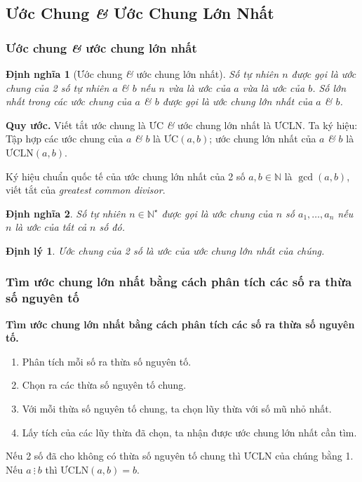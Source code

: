 \documentclass{article}
\numberwithin{equation}{section}
\newtheorem{definition}{Định nghĩa}[section]
\newtheorem{theorem}{Định lý}[section]
\begin{document}
\subsection{Ước Chung \textit{\&} Ước Chung Lớn Nhất}

\subsubsection{Ước chung \textit{\&} ước chung lớn nhất}

\begin{definition}[Ước chung \textit{\&} ước chung lớn nhất]
	Số tự nhiên $n$ được gọi là \emph{ước chung} của 2 số tự nhiên $a$ \textit{\&} $b$ nếu $n$ vừa là ước của $a$ vừa là ước của $b$. Số lớn nhất trong các ước chung của $a$ \textit{\&} $b$ được gọi là \emph{ước chung lớn nhất} của $a$ \textit{\&} $b$.
\end{definition}
\noindent\textbf{Quy ước.} Viết tắt ước chung là ƯC \textit{\&} ước chung lớn nhất là ƯCLN. Ta ký hiệu: Tập hợp các ước chung của $a$ \textit{\&} $b$ là $\mbox{ƯC}(a,b)$; ước chung lớn nhất của $a$ \textit{\&} $b$ là $\mbox{ƯCLN}(a,b)$.

Ký hiệu chuẩn quốc tế của ước chung lớn nhất của 2 số $a,b\in\mathbb{N}$ là $\gcd(a,b)$, viết tắt của \textit{greatest common divisor}.

\begin{definition}
	Số tự nhiên $n\in\mathbb{N}^\star$ được gọi là \emph{ước chung} của $n$ số $a_1,\ldots,a_n$ nếu $n$ là ước của tất cả $n$ số đó.
\end{definition}

\begin{theorem}
	Ước chung của 2 số là ước của ước chung lớn nhất của chúng.
\end{theorem}

\subsubsection{Tìm ước chung lớn nhất bằng cách phân tích các số ra thừa số nguyên tố}
\begin{tcolorbox}
	\textbf{Tìm ước chung lớn nhất bằng cách phân  tích các số ra thừa số nguyên tố.}
	\begin{enumerate}
		\item Phân tích mỗi số ra thừa số nguyên tố.
		\item Chọn ra các thừa số nguyên tố chung.
		\item Với mỗi thừa số nguyên tố chung, ta chọn lũy thừa với số mũ nhỏ nhất.
		\item Lấy tích của các lũy thừa đã chọn, ta nhận được ước chung lớn nhất cần tìm.
	\end{enumerate}
\end{tcolorbox}
Nếu 2 số đã cho không có thừa số nguyên tố chung thì ƯCLN của chúng bằng 1. Nếu $a\ \vdots\ b$ thì $\mbox{ƯCLN}(a,b) = b$.
\end{document}
